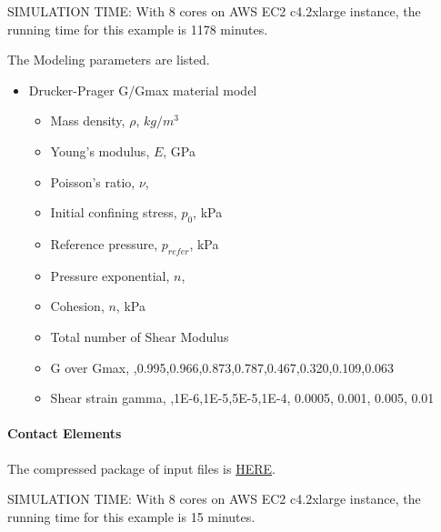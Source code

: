 SIMULATION TIME: With 8 cores on AWS EC2 c4.2xlarge instance, the running time for this example is 1178 minutes.

The Modeling parameters are listed.
\begin{itemize}
  \item Drucker-Prager G/Gmax material model 
  \begin{itemize}
    \item Mass density, $\rho$, \enspace {} $kg/m^3$
    \item Young's modulus, $E$, \enspace {} GPa
    \item Poisson's ratio, $\nu$, \enspace {}
    \item Initial confining stress, $p_0$, \enspace {} kPa
    \item Reference pressure, $p_{refer} $, \enspace {} kPa
    \item Pressure exponential, $ n  $, \enspace {}
    \item Cohesion, $ n  $, \enspace {} kPa
    \item Total number of Shear Modulus \enspace {}
    \item G over Gmax, \enspace {},0.995,0.966,0.873,0.787,0.467,0.320,0.109,0.063
    \item Shear strain gamma, \enspace {},1E-6,1E-5,5E-5,1E-4, 0.0005, 0.001, 0.005, 0.01
  \end{itemize}
\end{itemize}


\paragraph{Contact Elements}
The compressed package of input files is  
\href{https://github.com/yuan-energy/Real-ESSI-Short-Course-Examples/tree/master/short-course-examples/nonlinear_analysis_steps/soil-structure/contact/contact.tgz?raw=true}{HERE}. 

SIMULATION TIME: With 8 cores on AWS EC2 c4.2xlarge instance, the running time for this example is 15 minutes.

